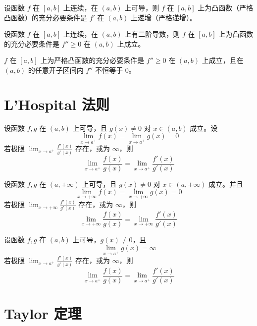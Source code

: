 \begin{theorem}
  设函数 $f$ 在 $[a,b]$ 上连续，在 $(a,b)$ 上可导，则 $f$ 在 $[a,b]$ 上为凸函数（严格凸函数）的充分必要条件是 $f'$ 在 $(a,b)$ 上递增（严格递增）。
\end{theorem}

\begin{theorem}
  设函数 $f$ 在 $[a,b]$ 上连续，在 $(a,b)$ 上有二阶导数，则 $f$ 在 $[a,b]$ 上为凸函数的充分必要条件是 $f'' \geqslant 0$ 在 $(a,b)$ 上成立。

  $f$ 在 $[a,b]$ 上为严格凸函数的充分必要条件是 $f'' \geqslant 0$ 在 $(a,b)$ 上成立，且在 $(a,b)$ 的任意开子区间内 $f''$ 不恒等于 $0$。
\end{theorem}

\section{L'Hospital 法则}

\begin{theorem}
  设函数 $f,g$ 在 $(a,b)$ 上可导，且 $g(x) \ne 0$ 对 $x \in (a,b)$ 成立。设 
  \[\lim_{x \to a^{+}}f(x) = \lim_{x \to a^{+}}g(x) = 0\]
  若极限  $\displaystyle \lim_{x \to a^{+}}\frac{f'(x)}{g'(x)}$ 存在，或为 $\infty$，则
  \[\lim_{x \to a^{+}}\frac{f(x)}{g(x)} = \lim_{x \to a^{+}}\frac{f'(x)}{g'(x)}\]
\end{theorem}

\begin{theorem}
  设函数 $f,g$ 在 $(a,+\infty)$ 上可导，且 $g(x) \ne 0$ 对 $x \in (a,+\infty)$ 成立。并且 
  \[\lim_{x \to +\infty}f(x) = \lim_{x \to +\infty}g(x) = 0\]
  若极限 $\displaystyle \lim_{x \to +\infty}\frac{f'(x)}{g'(x)}$ 存在，或为 $\infty$，则
  \[\lim_{x \to +\infty}\frac{f(x)}{g(x)} = \lim_{x \to +\infty}\frac{f'(x)}{g'(x)}\]
\end{theorem}

\begin{theorem}
  设函数 $f,g$ 在 $(a,b)$ 上可导，$g(x) \ne 0$，且 
  \[ \lim_{x \to a^{+}}g(x) = \infty\]
  若极限  $\displaystyle \lim_{x \to a^{+}}\frac{f'(x)}{g'(x)}$ 存在，或为 $\infty$，则
  \[\lim_{x \to a^{+}}\frac{f(x)}{g(x)} = \lim_{x \to a^{+}}\frac{f'(x)}{g'(x)}\]
\end{theorem}





\section{Taylor 定理}






